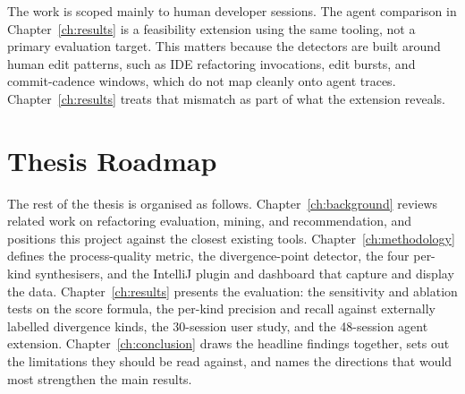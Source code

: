 The work is scoped mainly to human developer sessions. The agent comparison in Chapter~\ref{ch:results} is a feasibility extension using the same tooling, not a primary evaluation target. This matters because the detectors are built around human edit patterns, such as IDE refactoring invocations, edit bursts, and commit-cadence windows, which do not map cleanly onto agent traces. Chapter~\ref{ch:results} treats that mismatch as part of what the extension reveals.

\section{Thesis Roadmap}
The rest of the thesis is organised as follows. Chapter~\ref{ch:background} reviews related work on refactoring evaluation, mining, and recommendation, and positions this project against the closest existing tools. Chapter~\ref{ch:methodology} defines the process-quality metric, the divergence-point detector, the four per-kind synthesisers, and the IntelliJ plugin and dashboard that capture and display the data. Chapter~\ref{ch:results} presents the evaluation: the sensitivity and ablation tests on the score formula, the per-kind precision and recall against externally labelled divergence kinds, the 30-session user study, and the 48-session agent extension. Chapter~\ref{ch:conclusion} draws the headline findings together, sets out the limitations they should be read against, and names the directions that would most strengthen the main results.
